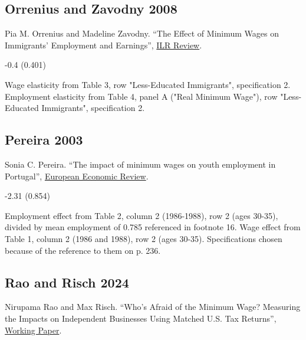 \subsection*{Orrenius and Zavodny 2008}
\vspace{-0.7em}

\noindent Pia M. Orrenius and Madeline Zavodny. ``The Effect of Minimum Wages on Immigrants' Employment and Earnings'', \href{https://doi.org/10.1177/001979390806100406}{ILR Review}.

\vspace{0.7em}

 -0.4 (0.401)

\vspace{0.7em}

 Wage elasticity from Table 3, row "Less-Educated Immigrants", specification 2. Employment elasticity from Table 4, panel A ("Real Minimum Wage"), row "Less-Educated Immigrants", specification 2.

\subsection*{Pereira 2003}
\vspace{-0.7em}

\noindent Sonia C. Pereira. ``The impact of minimum wages on youth employment in Portugal'', \href{https://doi.org/10.1016/S0014-2921(02)00209-X}{European Economic Review}.

\vspace{0.7em}

 -2.31 (0.854)

\vspace{0.7em}

 Employment effect from Table 2, column 2 (1986-1988), row 2 (ages 30-35), divided by mean employment of 0.785 referenced in footnote 16. Wage effect from Table 1, column 2 (1986 and 1988), row 2 (ages 30-35). Specifications chosen because of the reference to them on p. 236.

\subsection*{Rao and Risch 2024}
\vspace{-0.7em}

\noindent Nirupama Rao and Max Risch. ``Who's Afraid of the Minimum Wage? Measuring the Impacts on Independent Businesses Using Matched U.S. Tax Returns'', \href{https://www.nirupamarao.org/_files/ugd/ed3ee5_5b251b066aa74388917e8024285973db.pdf}{Working Paper}.


